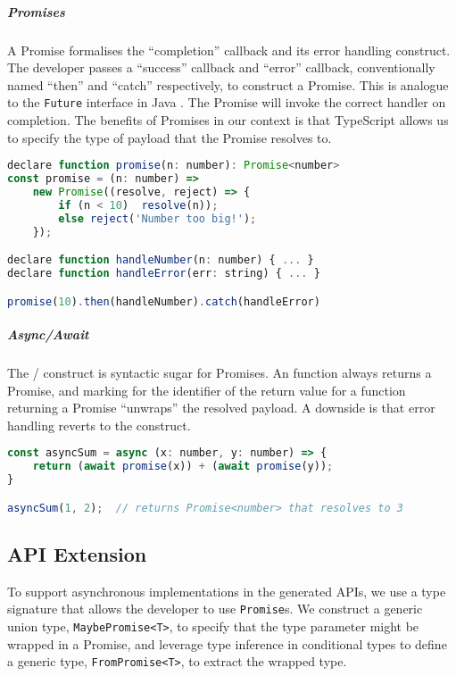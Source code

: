 \subparagraph{Promises}
A Promise formalises the ``completion'' callback
and its error handling construct. The developer passes a ``success''
callback and ``error'' callback, conventionally named
``then'' and ``catch'' respectively, to construct a Promise.
This is analogue to the \texttt{Future} interface in Java \cite{JavaFuture}.
The Promise will invoke the correct handler on completion.
The benefits of Promises in our context is that TypeScript allows
us to specify the type of payload that the Promise resolves to.

\begin{lstlisting}[language=javascript,numbers=none]
declare function promise(n: number): Promise<number>
const promise = (n: number) => 
	new Promise((resolve, reject) => {
		if (n < 10)  resolve(n));
		else reject('Number too big!');
	});

declare function handleNumber(n: number) { ... } 
declare function handleError(err: string) { ... }

promise(10).then(handleNumber).catch(handleError)
\end{lstlisting}

\subparagraph{Async/Await}
The / construct
is syntactic sugar for Promises. An 
function always returns a Promise, and marking 
for the identifier of the return value for a function returning a Promise
``unwraps'' the resolved payload. A downside is that error handling
reverts to the  construct.

\begin{lstlisting}[language=javascript,numbers=none]
const asyncSum = async (x: number, y: number) => {
	return (await promise(x)) + (await promise(y));
}

asyncSum(1, 2);  // returns Promise<number> that resolves to 3
\end{lstlisting}

\subsection{API Extension}
\label{subsection:asyncapi}

To support asynchronous implementations in the
generated APIs, we use a type signature that allows
the developer to use \texttt{Promise}s.
We construct a generic union type, \texttt{MaybePromise<T>},
to specify that the type parameter might be wrapped in a Promise,
and leverage type inference in conditional types to
define a generic type, \texttt{FromPromise<T>}, to extract
the wrapped type.

